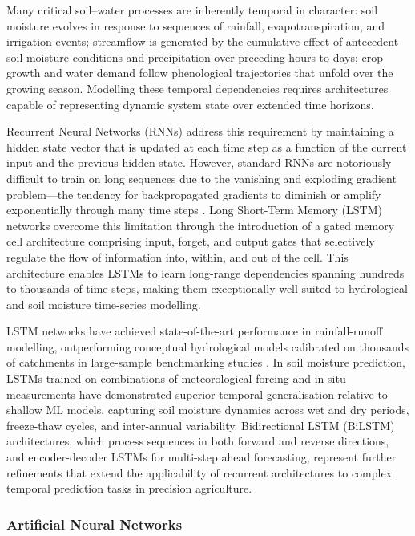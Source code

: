 \documentclass[land,article,submit,pdftex,moreauthors]{Definitions/mdpi}
\numberwithin{equation}{section}
\begin{document}
Many critical soil--water processes are inherently temporal in character: soil moisture evolves in response to sequences of rainfall, evapotranspiration, and irrigation events; streamflow is generated by the cumulative effect of antecedent soil moisture conditions and precipitation over preceding hours to days; crop growth and water demand follow phenological trajectories that unfold over the growing season. Modelling these temporal dependencies requires architectures capable of representing dynamic system state over extended time horizons.

Recurrent Neural Networks (RNNs) address this requirement by maintaining a hidden state vector that is updated at each time step as a function of the current input and the previous hidden state. However, standard RNNs are notoriously difficult to train on long sequences due to the vanishing and exploding gradient problem---the tendency for backpropagated gradients to diminish or amplify exponentially through many time steps \citep{bengio1994learning}. Long Short-Term Memory (LSTM) networks \citep{hochreiter1997long} overcome this limitation through the introduction of a gated memory cell architecture comprising input, forget, and output gates that selectively regulate the flow of information into, within, and out of the cell. This architecture enables LSTMs to learn long-range dependencies spanning hundreds to thousands of time steps, making them exceptionally well-suited to hydrological and soil moisture time-series modelling.

LSTM networks have achieved state-of-the-art performance in rainfall-runoff modelling, outperforming conceptual hydrological models calibrated on thousands of catchments in large-sample benchmarking studies \citep{kratzert2018rainfall}. In soil moisture prediction, LSTMs trained on combinations of meteorological forcing and in situ measurements have demonstrated superior temporal generalisation relative to shallow ML models, capturing soil moisture dynamics across wet and dry periods, freeze-thaw cycles, and inter-annual variability. Bidirectional LSTM (BiLSTM) architectures, which process sequences in both forward and reverse directions, and encoder-decoder LSTMs for multi-step ahead forecasting, represent further refinements that extend the applicability of recurrent architectures to complex temporal prediction tasks in precision agriculture.

\subsubsection{Artificial Neural Networks}
\end{document}
